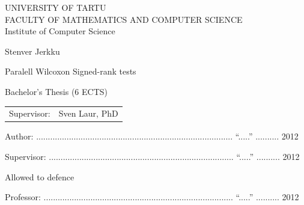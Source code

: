 \documentclass[12pt]{article}
\begin{document}
\thispagestyle{empty}
\begin{center}

\large
UNIVERSITY OF TARTU\\[2mm]
\uppercase{Faculty of Mathematics and Computer Science}\\[2mm]
Institute of Computer Science\\

\vspace{25mm}

\Large Stenver Jerkku

\vspace{4mm}

\huge Paralell Wilcoxon Signed-rank tests

\vspace{20mm}

\Large Bachelor's Thesis (6 ECTS)

\end{center}

\vspace{2mm}

\begin{flushright}
 {
 \setlength{\extrarowheight}{5pt}
 \begin{tabular}{r l}
  \sffamily Supervisor: & \sffamily Sven Laur, PhD
 \end{tabular}
 }
\end{flushright}

\vspace{10mm}

{\noindent Author: .................................................................................... ``.....'' ..........\hskip16pt 2012}
\vspace{2mm}

{\noindent Supervisor: ............................................................................... ``.....'' ..........\hskip16pt 2012}

\vspace{8mm}

{\noindent Allowed to defence}

{\noindent Professor: ................................................................................. ``.....'' ..........\hskip16pt 2012}
\end{document}
